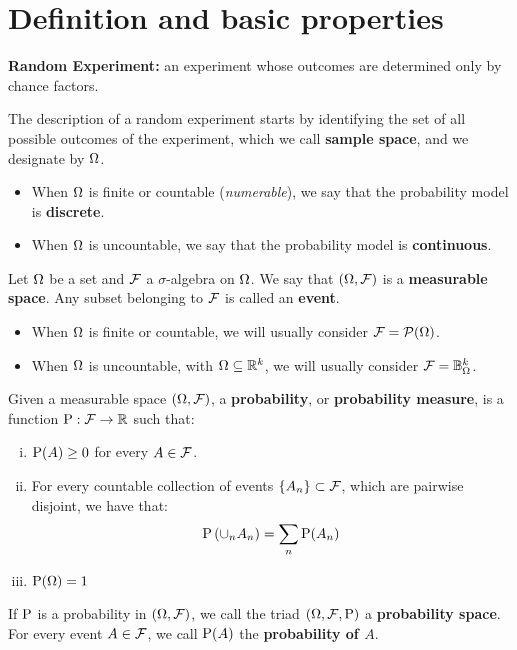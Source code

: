 
\section{Definition and basic properties}

\begin{definition}
	\textbf{Random Experiment:} an experiment whose outcomes are determined only by chance factors.
\end{definition}

\begin{definition}
	The description of a random experiment starts by identifying the set of all possible  outcomes of the experiment, which we call \textbf{sample space}, and we designate by $\O$.
	\begin{itemize}
		\item When $\O$ is finite or countable (\textit{numerable}), we say that the probability model is \textbf{discrete}.
		\item When $\O$ is uncountable, we say that the probability model is \textbf{continuous}.
	\end{itemize}
\end{definition}

\begin{definition}
	Let $\O$ be a set and $\F$ a $\sigma$-algebra on $\O$. We say that $(\O, \F)$ is a \textbf{measurable space}. Any subset belonging to $\F$ is called an \textbf{event}.
	\begin{itemize}
		\item When $\O$ is finite or countable, we will usually consider $\F = \mathcal{P}(\O)$.
		\item When $\O$ is uncountable, with $\O \subseteq \R^k$, we will usually consider $\F = \mathbb{B}_{\O}^k$.
	\end{itemize}
\end{definition}

\begin{definition}
	Given a measurable space $(\O, \F)$, a \textbf{probability}, or \textbf{probability measure}, is a function $\P: \F \rightarrow \R$ such that:
	\begin{enumerate}[i)]
		\item $\P(A) \geq 0$ for every $A \in \F$.
		\item For every countable collection of events $\{A_n\} \subset \F$, which are pairwise disjoint, we have that:
		\[
			\P \left(\cup_n A_n\right) = \sum_n \P(A_n)
		\]
		\item $\P(\O) = 1$
	\end{enumerate}
	If $\P$ is a probability in $(\O, \F)$, we call the triad $(\O, \F, \P)$ a \textbf{probability space}. For every event $A \in \F$, we call $\P(A)$ the \textbf{probability of $A$}.
\end{definition}


